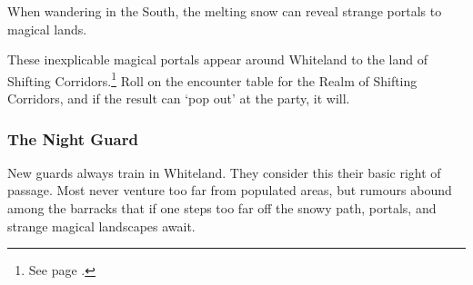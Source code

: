 \begin{multicols}{2}
When wandering in the South, the melting snow can reveal strange portals to magical lands.

These inexplicable magical portals appear around Whiteland to the land of Shifting Corridors.\footnote{See page \pageref{shiftingcorridors}.}
Roll on the encounter table for the Realm of Shifting Corridors, and if the result can `pop out' at the party, it will.

\subsubsection{The Night Guard}

New guards always train in Whiteland.
They consider this their basic right of passage.
Most never venture too far from populated areas, but rumours abound among the barracks that if one steps too far off the snowy path, portals, and strange magical landscapes await.

\end{multicols}

\vfill\null
